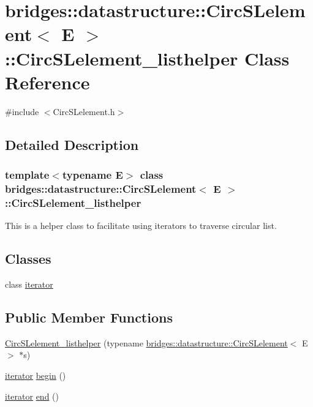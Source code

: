 \hypertarget{classbridges_1_1datastructure_1_1_circ_s_lelement_1_1_circ_s_lelement__listhelper}{}\section{bridges\+:\+:datastructure\+:\+:Circ\+S\+Lelement$<$ E $>$\+:\+:Circ\+S\+Lelement\+\_\+listhelper Class Reference}
\label{classbridges_1_1datastructure_1_1_circ_s_lelement_1_1_circ_s_lelement__listhelper}


{\ttfamily \#include $<$Circ\+S\+Lelement.\+h$>$}



\subsection{Detailed Description}
\subsubsection*{template$<$typename E$>$\newline
class bridges\+::datastructure\+::\+Circ\+S\+Lelement$<$ E $>$\+::\+Circ\+S\+Lelement\+\_\+listhelper}

This is a helper class to facilitate using iterators to traverse circular list. \subsection*{Classes}
\begin{DoxyCompactItemize}
\item 
class \hyperlink{classbridges_1_1datastructure_1_1_circ_s_lelement_1_1_circ_s_lelement__listhelper_1_1iterator}{iterator}
\end{DoxyCompactItemize}
\subsection*{Public Member Functions}
\begin{DoxyCompactItemize}
\item 
\hyperlink{classbridges_1_1datastructure_1_1_circ_s_lelement_1_1_circ_s_lelement__listhelper_acbdfc2d3415b54a52bb3b5e7b4bc9929}{Circ\+S\+Lelement\+\_\+listhelper} (typename \hyperlink{classbridges_1_1datastructure_1_1_circ_s_lelement}{bridges\+::datastructure\+::\+Circ\+S\+Lelement}$<$ E $>$ $\ast$s)
\item 
\hyperlink{classbridges_1_1datastructure_1_1_circ_s_lelement_1_1_circ_s_lelement__listhelper_1_1iterator}{iterator} \hyperlink{classbridges_1_1datastructure_1_1_circ_s_lelement_1_1_circ_s_lelement__listhelper_aa1294a519be56c74beec21d2c4a13864}{begin} ()
\item 
\hyperlink{classbridges_1_1datastructure_1_1_circ_s_lelement_1_1_circ_s_lelement__listhelper_1_1iterator}{iterator} \hyperlink{classbridges_1_1datastructure_1_1_circ_s_lelement_1_1_circ_s_lelement__listhelper_aceac5cae38d478dd16d2e44f329ea821}{end} ()
\end{DoxyCompactItemize}


